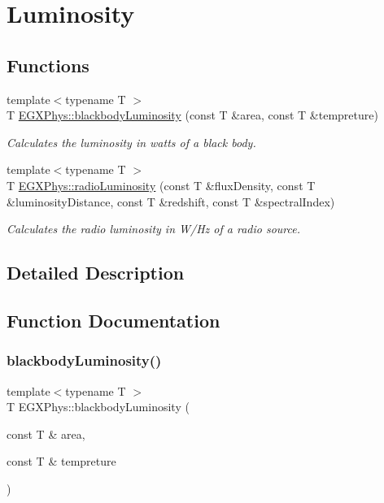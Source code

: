 \hypertarget{group___e_g_x_phys-_luminosity}{}\section{Luminosity}
\label{group___e_g_x_phys-_luminosity}
\subsection*{Functions}
\begin{DoxyCompactItemize}
\item 
{\footnotesize template$<$typename T $>$ }\\T \mbox{\hyperlink{group___e_g_x_phys-_luminosity_ga909f82edfaed449b44e94788b642ebb8}{E\+G\+X\+Phys\+::blackbody\+Luminosity}} (const T \&area, const T \&tempreture)
\begin{DoxyCompactList}\small\item\em Calculates the luminosity in watts of a black body. \end{DoxyCompactList}\item 
{\footnotesize template$<$typename T $>$ }\\T \mbox{\hyperlink{group___e_g_x_phys-_luminosity_ga6d6865b2aac1bc7c7f06b7c4ac2444e4}{E\+G\+X\+Phys\+::radio\+Luminosity}} (const T \&flux\+Density, const T \&luminosity\+Distance, const T \&redshift, const T \&spectral\+Index)
\begin{DoxyCompactList}\small\item\em Calculates the radio luminosity in W/\+Hz of a radio source. \end{DoxyCompactList}\end{DoxyCompactItemize}


\subsection{Detailed Description}


\subsection{Function Documentation}
\mbox{\label{group___e_g_x_phys-_luminosity_ga909f82edfaed449b44e94788b642ebb8}} 
\subsubsection{\texorpdfstring{blackbody\+Luminosity()}{blackbodyLuminosity()}}
{\footnotesize\ttfamily template$<$typename T $>$ \\
T E\+G\+X\+Phys\+::blackbody\+Luminosity (\begin{DoxyParamCaption}\item[{const T \&}]{area,  }\item[{const T \&}]{tempreture }\end{DoxyParamCaption})}



